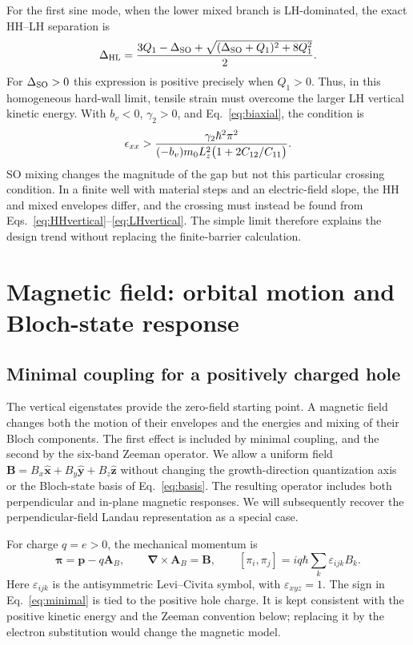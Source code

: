 For the first sine mode, when the lower mixed branch is LH-dominated, the exact HH--LH separation is
\begin{equation}
\Delta_{\mathrm{HL}}=\frac{3Q_1-\Delta_{\mathrm{SO}}
+\sqrt{(\Delta_{\mathrm{SO}}+Q_1)^2+8Q_1^2}}{2}.
\label{eq:hardwallgap}
\end{equation}
For $\Delta_{\mathrm{SO}}>0$ this expression is positive precisely when $Q_1>0$. Thus, in this homogeneous hard-wall limit, tensile strain must overcome the larger LH vertical kinetic energy. With $b_v<0$, $\gamma_2>0$, and Eq.~\eqref{eq:biaxial}, the condition is
\begin{equation}
\epsilon_ {xx}>
\frac{\gamma_2\hbar^2\pi^2}
{(-b_v)m_0L_z^2\bigl(1+2C_{12}/C_{11}\bigr)}.
\label{eq:strainthreshold}
\end{equation}
SO mixing changes the magnitude of the gap but not this particular crossing condition. In a finite well with material steps and an electric-field slope, the HH and mixed envelopes differ, and the crossing must instead be found from Eqs.~\eqref{eq:HHvertical}--\eqref{eq:LHvertical}. The simple limit therefore explains the design trend without replacing the finite-barrier calculation.

\section{Magnetic field: orbital motion and Bloch-state response}
\label{sec:magnetic}

\subsection{Minimal coupling for a positively charged hole}

The vertical eigenstates provide the zero-field starting point. A magnetic field changes both the motion of their envelopes and the energies and mixing of their Bloch components. The first effect is included by minimal coupling, and the second by the six-band Zeeman operator. We allow a uniform field $\bm B=B_x\hat{\bm x}+B_y\hat{\bm y}+B_z\hat{\bm z}$ without changing the growth-direction quantization axis or the Bloch-state basis of Eq.~\eqref{eq:basis}. The resulting operator includes both perpendicular and in-plane magnetic responses. We will subsequently recover the perpendicular-field Landau representation as a special case.

For charge $q=e>0$, the mechanical momentum is
\begin{equation}
\bm\pi=\bm p-q\bm A_B,
\qquad
\bm\nabla\times\bm A_B=\bm B,
\qquad
[\pi_i,\pi_j]=iq\hbar\sum_k\varepsilon_{ijk}B_k.
\label{eq:minimal}
\end{equation}
Here $\varepsilon_{ijk}$ is the antisymmetric Levi--Civita symbol, with $\varepsilon_{xyz}=1$. The sign in Eq.~\eqref{eq:minimal} is tied to the positive hole charge. It is kept consistent with the positive kinetic energy and the Zeeman convention below; replacing it by the electron substitution would change the magnetic model.

